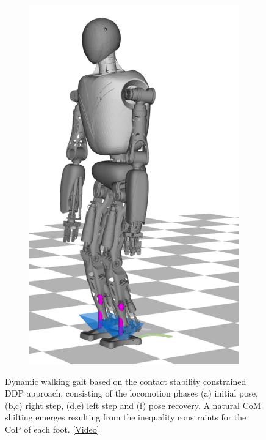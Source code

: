 \begin{figure}
\begin{subfigure}{.16\textwidth}
	\includegraphics[width=1\linewidth]{fig/walkDynamic/snaps/8}
	\caption{}
\end{subfigure}
\caption[Dynamic walking based on the contact stability constrained \gls{DDP}]{Dynamic walking gait based on the contact stability constrained \gls{DDP} approach, consisting of the locomotion phases (a) initial pose, (b,c) right step, (d,e) left step and (f) pose recovery. A natural \gls{CoM} shifting emerges resulting from the inequality constraints for the \gls{CoP} of each foot. \href{https://github.com/julesser/ma-thesis-simulation-results/blob/master/DynamicWalking_LargeSteps_CoP100_ArmsFreed/crocoddyl.mp4}{[Video]}}
\label{fig:walkDynamic_Snaps}
\end{figure}

